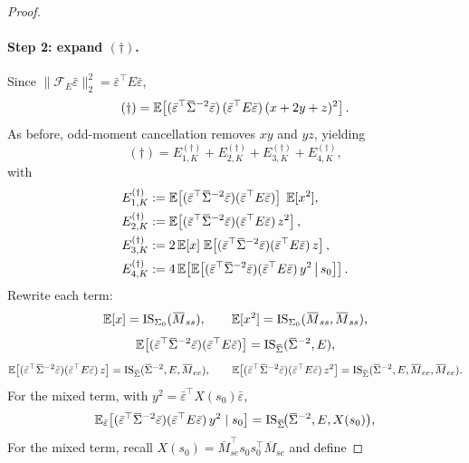 \begin{proof}
\paragraph{Step 2: expand $(\dagger)$.}
Since $\|\mathcal F_E\bar\varepsilon\|_2^2=\bar\varepsilon^\top E\bar\varepsilon$,
\[
(\dagger)
=
\E\!\left[(\bar\varepsilon^\top  \overline\Sigma^{-2}\bar\varepsilon)\,(\bar\varepsilon^\top E\bar\varepsilon)\,(x+2y+z)^2\right].
\]
As before, odd-moment cancellation removes $xy$ and $yz$, yielding
\[
(\dagger)=E^{(\dagger)}_{1,K}+E^{(\dagger)}_{2,K}+E^{(\dagger)}_{3,K}+E^{(\dagger)}_{4,K},
\]
with
\begin{align*}
E^{(\dagger)}_{1,K}
&:= \E\!\left[(\bar\varepsilon^\top  \overline\Sigma^{-2}\bar\varepsilon)(\bar\varepsilon^\top E\bar\varepsilon)\right]\;\E[x^2],\\
E^{(\dagger)}_{2,K}
&:= \E\!\left[(\bar\varepsilon^\top  \overline\Sigma^{-2}\bar\varepsilon)(\bar\varepsilon^\top E\bar\varepsilon)\,z^2\right],\\
E^{(\dagger)}_{3,K}
&:= 2\,\E[x]\;\E\!\left[(\bar\varepsilon^\top  \overline\Sigma^{-2}\bar\varepsilon)(\bar\varepsilon^\top E\bar\varepsilon)\,z\right],\\
E^{(\dagger)}_{4,K}
&:= 4\,\E\!\left[\E\!\left[(\bar\varepsilon^\top  \overline\Sigma^{-2}\bar\varepsilon)(\bar\varepsilon^\top E\bar\varepsilon)\,y^2\,\middle|\,s_0\right]\right].
\end{align*}
Rewrite each term:
\[
\E[x]=\mathrm{IS}_{\Sigma_0}(\overline M_{ss}),
\qquad
\E[x^2]=\mathrm{IS}_{\Sigma_0}(\overline M_{ss},\overline M_{ss}),
\]
\[
\E\!\left[(\bar\varepsilon^\top  \overline\Sigma^{-2}\bar\varepsilon)(\bar\varepsilon^\top E\bar\varepsilon)\right]
=\mathrm{IS}_{\overline\Sigma}( \overline\Sigma^{-2},E),
\]
\[
\E\!\left[(\bar\varepsilon^\top  \overline\Sigma^{-2}\bar\varepsilon)(\bar\varepsilon^\top E\bar\varepsilon)\,z\right]
=\mathrm{IS}_{\overline\Sigma}( \overline\Sigma^{-2},E,\overline M_{ee}),
\qquad
\E\!\left[(\bar\varepsilon^\top  \overline\Sigma^{-2}\bar\varepsilon)(\bar\varepsilon^\top E\bar\varepsilon)\,z^2\right]
=\mathrm{IS}_{\overline\Sigma}( \overline\Sigma^{-2},E,\overline M_{ee},\overline M_{ee}).
\]
For the mixed term, with $y^2=\bar\varepsilon^\top X(s_0)\bar\varepsilon$,
\[
\E_{\bar\varepsilon}\!\left[(\bar\varepsilon^\top  \overline\Sigma^{-2}\bar\varepsilon)(\bar\varepsilon^\top E\bar\varepsilon)\,y^2\mid s_0\right]
=\mathrm{IS}_{\overline\Sigma}\!\big( \overline\Sigma^{-2},E,X(s_0)\big),
\]
For the mixed term, recall $X(s_0)=\overline M_{se}^\top s_0 s_0^\top \overline M_{se}$ and define

\end{proof}
